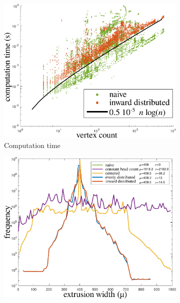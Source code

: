 \begin{figure}
\centering
\setlength{\figheight}{0.22\textwidth}
\setlength{\figwidth}{0.31\textwidth}
\begin{subfigure}{\figwidth}\centering
\includegraphics[height=\figheight]{sources/validation/computime2.pdf}
\caption{Computation time}
\label{computime}
\end{subfigure}
\begin{subfigure}{\figwidth}\centering
\includegraphics[height=\figheight]{sources/validation/widthHistogram.pdf}

\end{subfigure}
\end{figure}
